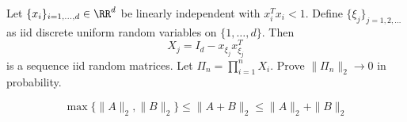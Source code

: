 \begin{example}
	Let $\{ x_i \}_{i=1,\dots, d} \in \RR^d$ be linearly independent with $x_i^T x_i < 1$. Define $\{\xi_j\}_{j=1,2,\dots}$ as iid discrete uniform random variables on $\{1,\dots, d \}$. Then
	$$X_j =  I_d - x_{\xi_j} x_{\xi_j}^T $$
	is a sequence iid random matrices. Let $\Pi_n = \prod_{i=1}^n X_i$. Prove $\| \Pi_n \|_2 \to 0$ in probability.
\end{example}

\begin{lemma}
	$$\max \{  \|A\|_2, \|B\|_2  \}\leq \|A + B\|_2 \leq \|A\|_2 + \|B\|_2$$
\end{lemma}